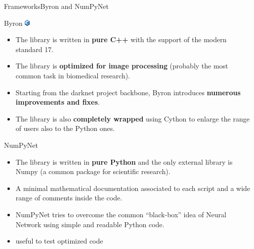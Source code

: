 \documentclass[10pt, unicode]{beamer}
\begin{document}
\begin{frame}{Frameworks}{Byron and NumPyNet}
 \scriptsize


  \begin{alertblock}{Byron \hfill\includegraphics[width=0.02\textwidth]{images/cpp.png}}
    \begin{itemize}
      \item The library is written in \textbf{pure \textsf{C++}} with the support of the modern standard 17.

      \item The library is \textbf{optimized for image processing} (probably the most common task in biomedical research).

      \item Starting from the \textsf{darknet project} backbone, \textsf{Byron} introduces \textbf{numerous improvements and fixes}.

      \item The library is also \textbf{completely wrapped} using \textsf{Cython} to enlarge the range of users also to the \textsf{Python} ones.
    
    \end{itemize}
  \end{alertblock}
  


    \begin{alertblock}{NumPyNet}
    \begin{itemize}
      \item The library is written in \textbf{pure \textsf{Python}} and the only external library is Numpy (a common package for scientific research). 

      \item A minimal mathematical documentation associated to each script and a wide range of comments inside the code.

      \item NumPyNet tries to overcome the common ``black-box'' idea of Neural Network using simple and readable Python code.
      
      \item useful to test optimized code

    \end{itemize}
  \end{alertblock}


\end{frame}
\end{document}
